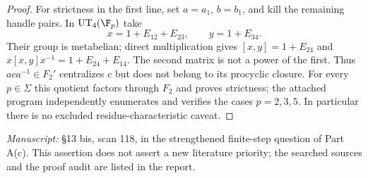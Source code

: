 \begin{proof}
For strictness in the first line, set $a=a_1$, $b=b_1$, and kill the remaining handle pairs. In $\operatorname{UT}_4(\F_p)$ take
\[
 x=1+E_{12}+E_{23},\qquad y=1+E_{34}.
\]
Their group is metabelian; direct multiplication gives $[x,y]=1+E_{24}$ and $x[x,y]x^{-1}=1+E_{24}+E_{14}$. The second matrix is not a power of the first. Thus $aca^{-1}\in F_2'$ centralizes $c$ but does not belong to its procyclic closure. For every $p\in\Sigma$ this quotient factors through $F_2$ and proves strictness; the attached program independently enumerates and verifies the cases $p=2,3,5$. In particular there is no excluded residue-characteristic caveat.
\end{proof}
\noindent\emph{Manuscript:} \S13 bis, scan 118, in the strengthened finite-step question of Part A(c). This assertion does not assert a new literature priority; the searched sources and the proof audit are listed in the report.

